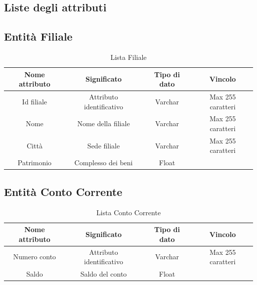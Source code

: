 \documentclass[12pt]{article}
\begin{document}
\clearpage


\begin{center}
    \section{Liste degli attributi}
\end{center}


\subsection*{Entità Filiale}
\begin{table}[h!]
    \centering
    \begin{tabular}{|c|c|c|c|}
        \hline
        Nome attributo & Significato & Tipo di dato & Vincolo \\
        \hline
        Id filiale & Attributo identificativo & Varchar & Max 255 caratteri \\
        \hline
        Nome & Nome della filiale & Varchar & Max 255 caratteri \\
        \hline
        Città & Sede filiale & Varchar & Max 255 caratteri \\
        \hline
        Patrimonio & Complesso dei beni & Float & \\
        \hline
    \end{tabular}
    \label{tab: entità filiale}
    \caption{Lista Filiale}
\end{table}


\subsection*{Entità Conto Corrente}
\begin{table}[h!]
    \centering
    \begin{tabular}{|c|c|c|c|}
        \hline
        Nome attributo & Significato & Tipo di dato & Vincolo \\
        \hline
        Numero conto & Attributo identificativo & Varchar & Max 255 caratteri \\
        \hline
        Saldo & Saldo del conto & Float & \\
        \hline
    \end{tabular}
    \caption{Lista Conto Corrente}
    \label{tab:my_label}
\end{table}
\end{document}
